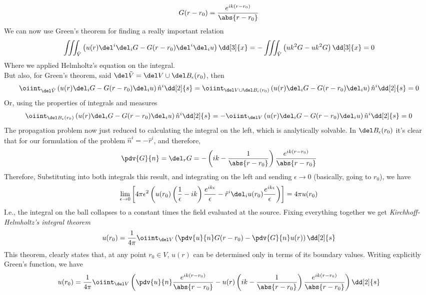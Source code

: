 \documentclass[../electromagnetism.tex]{subfiles}
\begin{document}
\begin{equation}
	G(r-r_0)=\frac{e^{ik(r-r_0)}}{\abs{r-r_0}}
	\label{eq:freespacegrf}
\end{equation}
We can now use Green's theorem for finding a really important relation
\begin{equation}
	\iiint_{\tilde{V}}\left(u(r)\del^i\del_iG-G(r-r_0)\del^i\del_iu\right)\dd[3]{x}=-\iiint_{\tilde{V}}\left( uk^2G-uk^2G \right)\dd[3]{x}=0
	\label{eq:gthmwaves}
\end{equation}
Where we applied Helmholtz's equation on the integral.\\
But also, for Green's theorem, said $\del\tilde{V}=\del V\cup\del B_\epsilon(r_0)$, then
\begin{equation}
	\oiint_{\del\tilde{V}}\left( u(r)\del_iG-G(r-r_0)\del_iu \right)\hat{n}^i\dd[2]{s}=\oiint_{\del V\cup\del B_\epsilon(r_0)}\left( u(r)\del_iG-G(r-r_0)\del_iu \right)\hat{n}^i\dd[2]{s}=0
	\label{eq:gthmdiff}
\end{equation}
Or, using the properties of integrals and measures
\begin{equation}
	\oiint_{\del B_\epsilon(r_0)}\left( u(r)\del_iG-G(r-r_0)\del_iu \right)\hat{n}^i\dd[2]{s}=-\oiint_{\del V}\left( u(r)\del_iG-G(r-r_0)\del_iu \right)\hat{n}^i\dd[2]{s}=0
	\label{eq:solkirchalm}
\end{equation}
The propagation problem now just reduced to calculating the integral on the left, which is analytically solvable. In $\del B_\epsilon(r_0)$ it's clear that for our formulation of the problem $\hat{n}^i=-\hat{r}^i$, and therefore, 
\begin{equation*}
	\pdv{G}{n}=\del_rG=-\left( ik-\frac{1}{\abs{r-r_0}} \right)\frac{e^{ik(r-r_0)}}{\abs{r-r_0}}
\end{equation*}
Therefore, Substituting into both integrals this result, and integrating on the left and sending $\epsilon\to0$ (basically, going to $r_0$), we have
\begin{equation*}
	\lim_{\epsilon\to0}\left[ 4\pi\epsilon^2\left( u(r_0)\left( \frac{1}{\epsilon}-ik \right)\frac{e^{ik\epsilon}}{\epsilon}-\hat{r}^i\del_iu(r_0)\frac{e^{ik\epsilon}}{\epsilon} \right) \right]=4\pi u(r_0)
\end{equation*}
I.e., the integral on the ball collapses to a constant times the field evaluated at the source. Fixing everything together we get \emph{Kirchhoff-Helmholtz's integral theorem}
\begin{equation}
	u(r_0)=\frac{1}{4\pi}\oiint_{\del V}\left( \pdv{u}{n}G(r-r_0)-\pdv{G}{n}u(r) \right)\dd[2]{s}
	\label{eq:kirchhoffhelmholtz.diff}
\end{equation}
This theorem, clearly states that, at any point $r_0\in V$, $u(r)$ can be determined only in terms of its boundary values. Writing explicitly Green's function, we have
\begin{equation}
	u(r_0)=\frac{1}{4\pi}\oiint_{\del V}\left( \pdv{u}{n}\frac{e^{ik(r-r_0)}}{\abs{r-r_0}}-u(r)\left( ik-\frac{1}{\abs{r-r_0}} \right)\frac{e^{ik(r-r_0)}}{\abs{r-r_0}} \right)\dd[2]{s}
	\label{eq:kirchhoff-expl.diff}
\end{equation}
\end{document}
